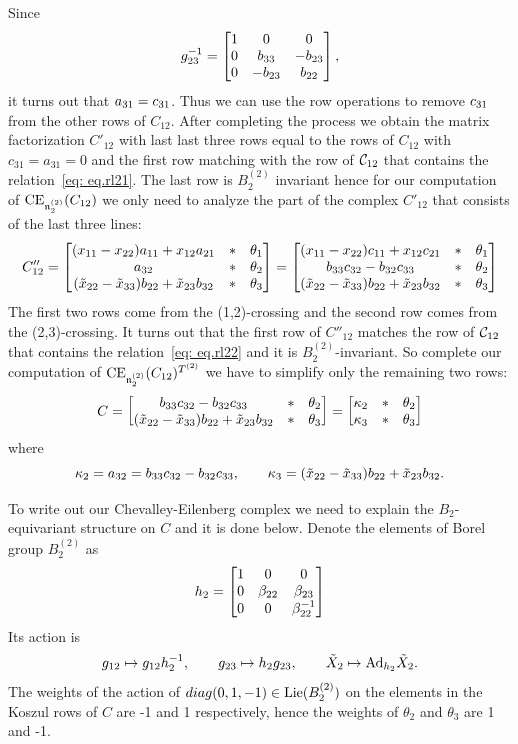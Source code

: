 Since
\[
g^{-1}_{23} =
\begin{bmatrix}  1 & 0 & 0 \\ 0 & b_{33} & -b_{23} \\ 0 & -b_{23} & b_{22} \end{bmatrix},
\]
it turns out that $a_{31} = c_{31}$. Thus we can use the row operations to remove $ c_{31}$ from the other rows of $C_{12}$. After completing the process we obtain
the matrix factorization $C'_{12}$ with last last three rows equal to the rows of $C_{12}$ with $c_{31}=a_{31}=0$ and the first row  matching with
the row of
$\mathcal{C}_{12}$ that contains the relation~\eqref{eq: eq.rl21}. The last row is $B^{(2)}_2$ invariant  hence for our computation of $\mathrm{CE}_{\mathfrak{n}^{(2)}_2}(C_{12})$ we only need to analyze the part of the complex $C'_{12}$ that consists of
the last three lines:
\[
C''_{12}=\begin{bmatrix} 
(x_{11}-x_{22})a_{11} + x_{12}a_{21} & * &\theta_1
\\
a_{32} & * &\theta_2
\\
(\tilde{x}_{22}-\tilde{x}_{33})b_{22} + \tilde{x}_{23}b_{32} & * &\theta_3
 \end{bmatrix}
=
\begin{bmatrix} 
(x_{11}-x_{22})c_{11} + x_{12}c_{21} & * &\theta_1
\\
b_{33} c_{32} - b_{32} c_{33} & * &\theta_2
\\
(\tilde{x}_{22}-\tilde{x}_{33})b_{22} + \tilde{x}_{23}b_{32} & * &\theta_3
 \end{bmatrix}
\]
The first two rows come from the (1,2)-crossing and the second row comes from the (2,3)-crossing.
It turns out that the first row of $C''_{12}$  matches the  row of $\mathcal{C}_{12}$ that contains the relation~\eqref{eq: eq.rl22} and it is $B_2^{(2)}$-invariant.
So complete our computation of $\mathrm{CE}_{\mathfrak{n}_2^{(2)}}(C_{12})^{T^{(2)}}$ we have to simplify only the remaining two rows:
\[
C=\begin{bmatrix} 
b_{33} c_{32} - b_{32} c_{33} & * &\theta_2
\\
(\tilde{x}_{22}-\tilde{x}_{33})b_{22} + \tilde{x}_{23}b_{32} & * &\theta_3
 \end{bmatrix} =
\begin{bmatrix} 
\kappa_2 & * &\theta_2
\\
\kappa_3 & * &\theta_3
 \end{bmatrix}
\]
where
\[
\kappa_2 = a_{32} = b_{33} c_{32} - b_{32} c_{33},\qquad
\kappa_3 = (\tilde{x}_{22}-\tilde{x}_{33})b_{22} + \tilde{x}_{23}b_{32}.
\]

To write out our Chevalley-Eilenberg complex we need to explain the $B_2$-equivariant structure on $C$ and it is done below.
Denote the elements of Borel group $B^{(2)}_2$  as
\[
\brht = \xbmtr{
1 & 0 & 0
\\
0 & \ybettt & \ybetth
\\
0 & 0 & \ybettt^{-1}%
}
\]
Its action is
\[
g_{12}\mapsto g_{12}h^{-1}_2,\qquad
g_{23}\mapsto h_2g_{23},\qquad
\tilde{X}_2\mapsto {\rm Ad}_{h_2} \tilde{X}_2.
\]
The weights of the action of $diag(0,1,-1)\in \mathrm{Lie}(B_2^{(2)})$  on  the \rhs elements in the Koszul rows of $C$ are -1 and 1 respectively, hence the weights of $\theta_2$ and $\theta_3$ are 1 and -1.

